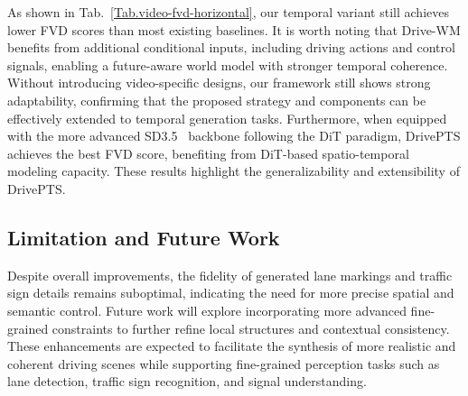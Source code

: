 As shown in Tab.~\ref{Tab.video-fvd-horizontal}, our temporal variant still achieves lower FVD scores than most existing baselines.
It is worth noting that Drive-WM\cite{wang2024driving} benefits from additional conditional inputs, including driving actions and control signals, enabling a future-aware world model with stronger temporal coherence.
Without introducing video-specific designs, our framework still shows strong adaptability, confirming that the proposed strategy and components can be effectively extended to temporal generation tasks.
Furthermore, when equipped with the more advanced SD3.5~\cite{esser2024scaling} backbone following the DiT paradigm, DrivePTS achieves the best FVD score, benefiting from DiT-based spatio-temporal modeling capacity.
These results highlight the generalizability and extensibility of DrivePTS.

\subsection{Limitation and Future Work}
Despite overall improvements, the fidelity of generated lane markings and traffic sign details remains suboptimal, indicating the need for more precise spatial and semantic control.
Future work will explore incorporating more advanced fine-grained constraints to further refine local structures and contextual consistency.
These enhancements are expected to facilitate the synthesis of more realistic and coherent driving scenes while supporting fine-grained perception tasks such as lane detection, traffic sign recognition, and signal understanding.

